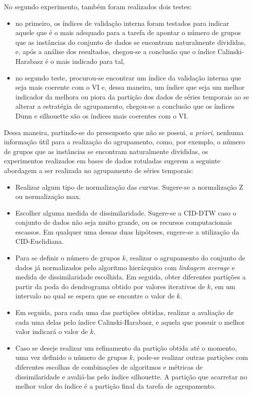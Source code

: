 No segundo experimento, também foram realizados dois testes:
\begin{itemize}
	\item no primeiro, os índices de validação interna foram testados para indicar aquele que é o mais adequado para a tarefa de apontar o número de grupos que as instâncias do conjunto de dados se encontram naturalmente divididas, e, após a análise dos resultados, chegou-se a conclusão que o índice Calinski-Harabasz é o mais indicado para tal,
	\item no segundo teste, procurou-se encontrar um índice da validação interna que seja mais coerente com o VI e, dessa maneira, um índice que seja um melhor indicador da melhora ou piora da partição dos dados de séries temporais ao se alterar a estratégia de agrupamento, chegou-se a conclusão que os índices Dunn e silhouette são os índices mais coerentes com o VI.
\end{itemize}

Dessa maneira, partindo-se do pressuposto que não se possui, \emph{a priori}, nenhuma informação útil para a realização do agrupamento, como, por exemplo, o número de grupos que as instâncias se encontram naturalmente divididas, os experimentos realizados em bases de dados rotuladas sugerem a seguinte abordagem a ser realizada no agrupamento de séries temporais:

\begin{itemize}
	\item Realizar algum tipo de normalização das curvas. Sugere-se a normalização Z ou normalização max.
	\item Escolher alguma medida de dissimilaridade. Sugere-se a CID-DTW caso o conjunto de dados não seja muito grande, ou os recursos computacionais escassos. Em qualquer uma dessas duas hipóteses, sugere-se a utilização da CID-Euclidiana.
	\item Para se definir o número de grupos $k$, realizar o agrupamento do conjunto de dados já normalizados pelo algoritmo hierárquico com \emph{linkagem average} e medida de dissimilaridade escolhida. Em seguida, obter diferentes partições a partir da poda do dendrograma obtido por valores iterativos de $k$, em um intervalo no qual se espera que se encontre o valor de $k$.
	\item Em seguida, para cada uma das partições obtidas, realizar a avaliação de cada uma delas pelo índice Calinski-Harabasz, e aquela que possuir o melhor valor indicará o valor de $k$.
	\item Caso se deseje realizar um refinamento da partição obtida até o momento, uma vez definido o número de grupos $k$, pode-se realizar outras partições com diferentes escolhas de combinações de algoritmos e métricas de dissimilaridade e avaliá-las pelo índice silhouette. A partição que acarretar no melhor valor do índice é a partição final da tarefa de agrupamento.
\end{itemize}

